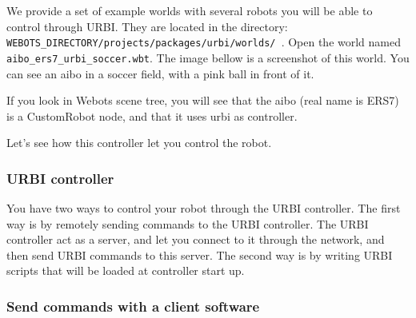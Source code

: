 We provide a set of example worlds with several robots you will be
able to control through URBI. They are located in the directory:
\nolinkurl{WEBOTS_DIRECTORY/projects/packages/urbi/worlds/ }.  Open
the world named \nolinkurl{aibo_ers7_urbi_soccer.wbt}. The image
bellow is a screenshot of this world. You can see an aibo in a soccer
field, with a pink ball in front of it.




If you look in Webots scene tree, you will see that the aibo (real
name is ERS7) is a CustomRobot node, and that it uses urbi as
controller.




Let's see how this controller let you control the robot.


\subsubsection{URBI controller}
\label{webots.firstrun.urbicontroller}%

You have two ways to control your robot through the URBI
controller. The first way is by remotely sending commands to the URBI
controller. The URBI controller act as a server, and let you connect
to it through the network, and then send URBI commands to this server.
The second way is by writing URBI scripts that will be loaded at
controller start up.


\subsubsection{Send commands with a client software}
\label{webots.firstrun.clientsoftware}%

